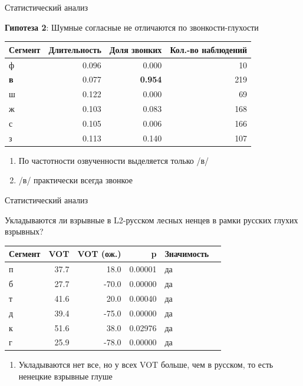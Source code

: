 \documentclass[10 pt, handout]{beamer}
\begin{document}
\begin{frame}{Статистический анализ}

	\textbf{Гипотеза 2}: Шумные согласные не отличаются по звонкости-глухости
	\vfill
	
\begin{tabular}{lrrr}
\toprule
\textbf{Сегмент} &  \textbf{Длительность} &  \textbf{Доля звонких} & \textbf{Кол.-во наблюдений}\\
\midrule
ф       &     0.096 &   0.000 &     10 \\
\textbf{в}       &     0.077 &   \textbf{0.954} &    219 \\
ш       &     0.122 &   0.000 &     69 \\
ж       &     0.103 &   0.083 &    168 \\
с       &     0.105 &   0.006 &    166 \\
з       &     0.113 &   0.140 &    107 \\
\bottomrule
\end{tabular}

	\vfill

	\begin{enumerate}[$\gg$]
		\item По частотности озвученности выделяется только /в/
		\item /в/ практически всегда звонкое
	\end{enumerate}

\end{frame}

\begin{frame}{Статистический анализ}

	Укладываются ли взрывные в L2-русском лесных ненцев в рамки русских глухих взрывных?
	\vfill
	
\begin{tabular}{lrrrlr}
\toprule
\textbf{Сегмент} &  \textbf{VOT} &  \textbf{VOT (ож.)} &       \textbf{p} & \textbf{Значимость}\\
\midrule
      п &      37.7 &      18.0 & 0.00001 &         да \\
      б &      27.7 &     -70.0 & 0.00000 &         да \\
      т &      41.6 &      20.0 & 0.00040 &         да \\
      д &      39.4 &     -75.0 & 0.00000 &         да \\
      к &      51.6 &      38.0 & 0.02976 &         да \\
      г &      25.9 &     -78.0 & 0.00000 &         да \\
\bottomrule
\end{tabular}

	\vfill
	\begin{enumerate}[$\gg$]
		\item Укладываются нет все, но у всех VOT больше, чем в русском, то есть ненецкие взрывные глуше
	\end{enumerate}

\end{frame}
\end{document}
